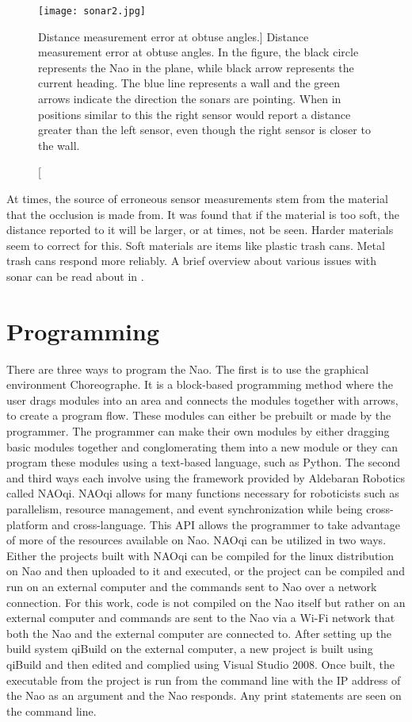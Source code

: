 \begin{figure}[h]
	\centering
	\texttt{[image: sonar2.jpg]}
	\caption
	[Distance measurement error at obtuse angles.]
	{Distance measurement error at obtuse angles. In the figure, the black circle represents the Nao in the plane, 
		while black arrow represents the current heading. The blue line represents a wall and the green arrows indicate
		the direction the sonars are pointing. When in positions similar to this the right sensor would report a distance
		greater than the left sensor, even though the right sensor is closer to the wall.}
	\label{fig:sonar2}
\end{figure}

At times, the source of erroneous sensor measurements stem from the material that the occlusion is made from. It was found that if the material is too soft, the distance reported to it will be larger, or at times, not be seen. Harder materials seem to correct for this. Soft materials are items like plastic trash cans. Metal trash cans respond more reliably.
A brief overview about various issues with sonar can be read about in \cite{sonar_issues1}.

\section{Programming}
There are three ways to program the Nao. The first is to use the graphical environment Choreographe. It is a block-based programming method where the user drags modules into an area and connects the modules together with arrows, to create a program flow. These modules can either be prebuilt or made by the programmer. The programmer can make their own modules by either dragging basic modules together and conglomerating them into a new module or they can program these modules using a text-based language, such as Python.
The second and third ways each involve using the framework provided by Aldebaran Robotics called NAOqi. NAOqi allows for many functions necessary for roboticists such as parallelism, resource management, and event synchronization while being cross-platform and cross-language\cite{NAOqi_overview1}. This API allows the programmer to take advantage of more of the resources available on Nao. NAOqi can be utilized in two ways. Either the projects built with NAOqi can be compiled for the linux distribution on Nao and then uploaded to it and executed, or the project can be compiled and run on an external computer and the commands sent to Nao over a network connection.
For this work, code is not compiled on the Nao itself but rather on an external computer and commands are sent to the Nao via a Wi-Fi network that both the Nao and the external computer are connected to. 
After setting up the build system qiBuild \cite{qiBuild_tutorial1} on the external computer, a new project is built using qiBuild and then edited and complied using Visual Studio 2008. Once built, the executable from the project is run from the command line with the IP address of the Nao as an argument and the Nao responds. Any print statements are seen on the command line.

